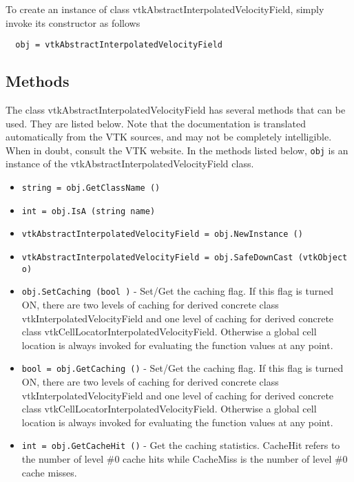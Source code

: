 To create an instance of class vtkAbstractInterpolatedVelocityField, simply
invoke its constructor as follows
\begin{verbatim}
  obj = vtkAbstractInterpolatedVelocityField
\end{verbatim}
\subsection{Methods}

The class vtkAbstractInterpolatedVelocityField has several methods that can be used.
  They are listed below.
Note that the documentation is translated automatically from the VTK sources,
and may not be completely intelligible.  When in doubt, consult the VTK website.
In the methods listed below, \verb|obj| is an instance of the vtkAbstractInterpolatedVelocityField class.
\begin{itemize}
\item  \verb|string = obj.GetClassName ()|

\item  \verb|int = obj.IsA (string name)|

\item  \verb|vtkAbstractInterpolatedVelocityField = obj.NewInstance ()|

\item  \verb|vtkAbstractInterpolatedVelocityField = obj.SafeDownCast (vtkObject o)|

\item  \verb|obj.SetCaching (bool )| -  Set/Get the caching flag. If this flag is turned ON, there are two levels
 of caching for derived concrete class vtkInterpolatedVelocityField and one
 level of caching for derived concrete class vtkCellLocatorInterpolatedVelocityField.
 Otherwise a global cell location is always invoked for evaluating the 
 function values at any point.

\item  \verb|bool = obj.GetCaching ()| -  Set/Get the caching flag. If this flag is turned ON, there are two levels
 of caching for derived concrete class vtkInterpolatedVelocityField and one
 level of caching for derived concrete class vtkCellLocatorInterpolatedVelocityField.
 Otherwise a global cell location is always invoked for evaluating the 
 function values at any point.

\item  \verb|int = obj.GetCacheHit ()| -  Get the caching statistics. CacheHit refers to the number of level \#0 cache
 hits while CacheMiss is the number of level \#0 cache misses.


\end{itemize}
